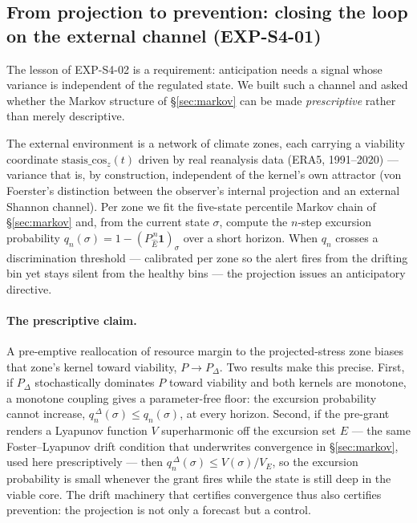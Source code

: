 \documentclass[11pt, a4paper]{article}
\begin{document}
\subsection{From projection to prevention: closing the loop on the external channel (EXP-S4-01)}
\label{sec:prevention}

The lesson of EXP-S4-02 is a requirement: anticipation needs a signal whose variance is
independent of the regulated state. We built such a channel and asked whether the Markov
structure of \S\ref{sec:markov} can be made \emph{prescriptive} rather than merely descriptive.

The external environment is a network of climate zones, each carrying a viability coordinate
$\text{stasis\_cos}_z(t)$ driven by real reanalysis data (ERA5, 1991--2020) --- variance that is,
by construction, independent of the kernel's own attractor (von Foerster's distinction between the
observer's internal projection and an external Shannon channel). Per zone we fit the five-state
percentile Markov chain of \S\ref{sec:markov} and, from the current state $\sigma$, compute the
$n$-step excursion probability $q_n(\sigma) = 1 - (P_{\hat E}^{\,n}\mathbf 1)_\sigma$ over a short
horizon. When $q_n$ crosses a discrimination threshold --- calibrated per zone so the alert fires
from the drifting bin yet stays silent from the healthy bins --- the projection issues an
anticipatory directive.

\paragraph{The prescriptive claim.} A pre-emptive reallocation of resource margin to the
projected-stress zone biases that zone's kernel toward viability, $P \to P_\Delta$. Two results
make this precise. First, if $P_\Delta$ stochastically dominates $P$ toward viability and both
kernels are monotone, a monotone coupling gives a parameter-free floor: the excursion probability
cannot increase, $q_n^{\,\Delta}(\sigma) \le q_n(\sigma)$, at every horizon. Second, if the
pre-grant renders a Lyapunov function $V$ superharmonic off the excursion set $E$ --- the same
Foster--Lyapunov drift condition that underwrites convergence in \S\ref{sec:markov}, used here
prescriptively --- then $q_n^{\,\Delta}(\sigma) \le V(\sigma)/V_E$, so the excursion probability is
small whenever the grant fires while the state is still deep in the viable core. The drift
machinery that certifies convergence thus also certifies prevention: the projection is not only a
forecast but a control.
\end{document}
